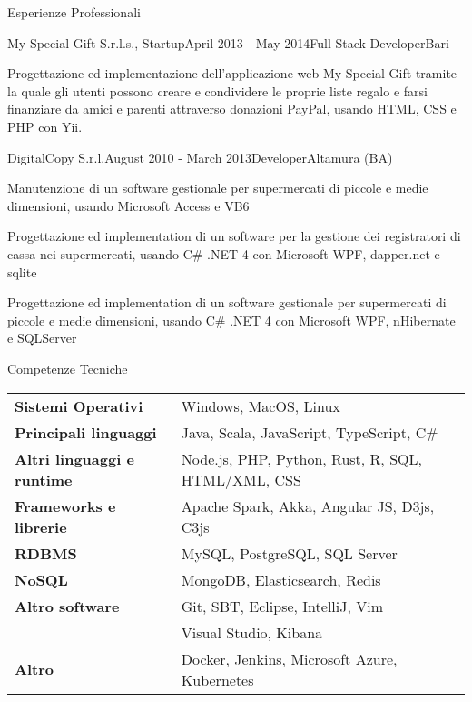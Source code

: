 \documentclass{resume} %
\begin{document}
\begin{rSection}{Esperienze Professionali}

\begin{rSubsection}{My Special Gift S.r.l.s., Startup}{April 2013 - May 2014}{Full Stack Developer}{Bari}
\item Progettazione ed implementazione dell'applicazione web My Special Gift tramite la quale gli utenti possono creare e condividere le proprie liste regalo e farsi finanziare da amici e parenti attraverso donazioni PayPal, usando HTML, CSS e PHP con Yii.
\end{rSubsection}


\begin{rSubsection}{DigitalCopy S.r.l.}{August 2010 - March 2013}{Developer}{Altamura (BA)}
\item Manutenzione di un software gestionale per supermercati di piccole e medie dimensioni, usando Microsoft Access e VB6
\item Progettazione ed implementation di un software per la gestione dei registratori di cassa nei supermercati, usando C\# .NET 4 con Microsoft WPF, dapper.net e sqlite
\item Progettazione ed implementation di un software gestionale per supermercati di piccole e medie dimensioni, usando C\# .NET 4 con Microsoft WPF, nHibernate e SQLServer
\end{rSubsection}

\end{rSection}


\begin{rSection}{Competenze Tecniche}

\begin{tabular}{ @{} >{\bfseries}l @{\hspace{6ex}} l }
Sistemi Operativi & Windows, MacOS, Linux \\
Principali linguaggi & Java, Scala, JavaScript, TypeScript, C\# \\
Altri linguaggi e runtime & Node.js, PHP, Python, Rust, R, SQL, HTML/XML, CSS \\
Frameworks e librerie & Apache Spark, Akka, Angular JS, D3js, C3js \\
RDBMS & MySQL, PostgreSQL, SQL Server \\
NoSQL & MongoDB, Elasticsearch, Redis \\
Altro software & Git, SBT, Eclipse, IntelliJ, Vim \\
& Visual Studio, Kibana \\
Altro & Docker, Jenkins, Microsoft Azure, Kubernetes \\
\end{tabular}

\end{rSection}
\end{document}
